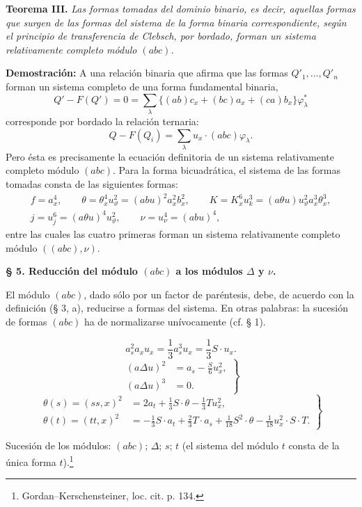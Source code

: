 \documentclass[11pt]{article}
\newcommand{\A}{\Delta}
\begin{document}
\clearpage
\noindent\textbf{Teorema III.}
\emph{Las formas tomadas del dominio binario, es decir, aquellas formas que surgen de las formas del sistema de la forma binaria correspondiente, según el principio de transferencia de Clebsch, por bordado, forman un sistema relativamente completo módulo $(abc)$.}

\noindent\textbf{Demostración:}
A una relación binaria que afirma que las formas $Q'_1,\ldots,Q'_n$ forman un sistema completo de una forma fundamental binaria,
\[
Q'-F(Q')=0=\sum_\lambda\bigl\{(ab)c_x+(bc)a_x+(ca)b_x\bigr\}\varphi_\lambda^{*}
\]
corresponde por bordado la relación ternaria:
\[
Q-F(Q_i)=\sum_\lambda u_x\cdot(abc)\varphi_\lambda .
\]
Pero ésta es precisamente la ecuación definitoria de un sistema relativamente completo módulo $(abc)$. Para la forma bicuadrática, el sistema de las formas tomadas consta de las siguientes formas:
\[
\begin{gathered}
f=a_x^4,\qquad
\theta=\theta_x^4u_\vartheta^2=(abu)^2a_x^2b_x^2,\qquad
K=K_x^6u_k^3=(a\theta u)u_\vartheta^2a_x^3\theta_x^3,\\
j=u_j^6=(a\theta u)^4u_\vartheta^2,\qquad
\nu=u_\nu^4=(abu)^4,
\end{gathered}
\]
entre las cuales las cuatro primeras forman un sistema relativamente completo módulo $((abc),\nu)$.

\begin{center}
\textbf{§ 5. \quad Reducción del módulo $(abc)$ a los módulos $\A$ y $\nu$.}
\end{center}

El módulo $(abc)$, dado sólo por un factor de paréntesis, debe, de acuerdo con la definición (§ 3, a), reducirse a formas del sistema. En otras palabras: la sucesión de formas $(abc)$ ha de normalizarse unívocamente (cf. § 1).

\[
a_s^2a_xu_x=\frac13 a_s^3u_x=\frac13 S\cdot u_x. \tag{2}
\]
\[
\left.
\begin{aligned}
(a\A u)^2&=a_s-\frac{S}{6}u_x^2,\\
(a\A u)^3&=0.
\end{aligned}
\right\} \tag{3}
\]
\[
\left.
\begin{aligned}
\theta(s)=(ss,x)^2&=2a_t+\frac13 S\cdot\theta-\frac13 Tu_x^2,\\
\theta(t)=(tt,x)^2&=-\frac13 S\cdot a_t+\frac23 T\cdot a_s+\frac1{18}S^2\cdot\theta-\frac1{18}u_x^2\cdot S\cdot T.
\end{aligned}
\right\} \tag{4}
\]

Sucesión de los módulos: $(abc)$; $\A$; $s$; $t$ (el sistema del módulo $t$ consta de la única forma $t$).\footnote{Gordan--Kerschensteiner, loc. cit. p. 134.}
\end{document}
